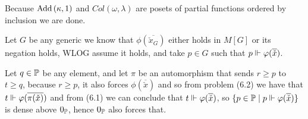 \begin{cExercise}
\begin{cPart}
		Because $\Add{\kappa}{1}$ and $Col(\omega,\lambda)$ are posets of partial functions ordered by inclusion we are done.
	\end{cPart}
	\begin{cPart}
		Let $G$ be any generic we know that $\phi(\overline{\check{x}_G})$ either holds in $M[G]$ or its negation holds, WLOG assume it holds, and take $p\in G$ such that $p\force \phi(\overline{\check{x}})$.
		
		Let $q\in\P$ be any element, and let $\pi$ be an automorphism that sends $r\ge p$ to $t\ge q$, because $r\ge p$, it also forces $\phi(\overline{\check{x}})$ and so from problem (6.2) we have that $t\force \phi(\overline{\pi(\check{x})})$ and from (6.1) we can conclude that $t\force \phi(\overline{\check{x}})$, so $\{p\in \P\mid p\force\phi(\overline{\check{x}})\}$ is dense above $0_\P$, hence $0_\P$ also forces that.
	\end{cPart}
\end{cExercise}








